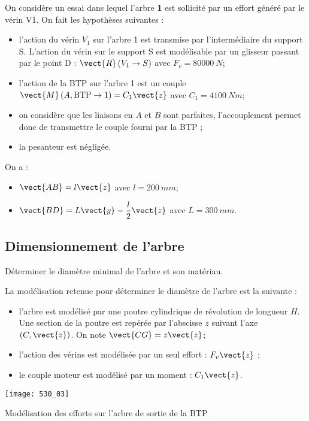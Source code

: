  

On considère un essai dans lequel l’arbre \textbf{1} est sollicité par un effort généré par le vérin V1. On fait les hypothèses suivantes :
\begin{itemize}
\item l’action du vérin $V_1$ sur l’arbre 1 est transmise par l’intermédiaire du support S. L’action du vérin sur le support S est modélisable par un glisseur passant par le point D : $\vect{R}\left( V_1\to S\right)$ avec $F_v=\SI{80 000}{N}$;
\item l’action de la BTP sur l’arbre 1 est un couple $\vect{M}\left(A,\text{BTP}\to 1 \right)=C_1 \vect{z}$ avec $C_1=\SI{4 100}{Nm}$;
\item on considère que les liaisons en $A$ et $B$ sont parfaites, l’accouplement permet donc de transmettre le couple fourni par la BTP ;
\item la pesanteur est négligée.
\end{itemize}
On a :
\begin{itemize}
\item $\vect{AB}=l\vect{z}$ avec $l=\SI{200}{mm}$;
\item $\vect{BD}=L\vect{y}-\dfrac{l}{2}\vect{z}$ avec $L=\SI{300}{mm}$.
\end{itemize}

\fi

\subsection*{Dimensionnement de l’arbre}
\begin{obj}	Déterminer le diamètre minimal de l’arbre et son matériau.
\end{obj}

La modélisation retenue pour déterminer le diamètre de l’arbre est la suivante  :
\begin{itemize}
\item l’arbre est modélisé par une poutre cylindrique de révolution de longueur $H$. Une section de la poutre est repérée par l’abscisse $z$ suivant l’axe $(C,\vect{z})$. On note $\vect{CG}=z\vect{z}$;
\item l’action des vérins est modélisée par un seul effort : $F_v \vect{z}$ ;
\item le couple moteur est modélisé par un moment : $C_1\vect{z}$.
\end{itemize} 

\begin{marginfigure}
\texttt{[image: 530\_03]}

\caption{Modélisation des efforts sur l’arbre de sortie de la BTP}
\end{marginfigure}

